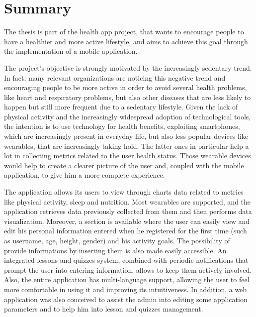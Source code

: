 \section{Summary}

The thesis is part of the health app project, that wants to encourage people to have a healthier and more active lifestyle, and aims to achieve this goal through the implementation of a mobile application.
\vspace{2ex}

\noindent The project's objective is strongly motivated by the increasingly sedentary trend. In fact, many relevant organizations are noticing this negative trend and encouraging people to be more active in order to avoid several health problems, like heart and respiratory problems, but also other diseases that are less likely to happen but still more frequent due to a sedentary lifestyle. Given the lack of physical activity and the increasingly widespread adoption of technological tools, the intention is to use technology for health benefits, exploiting smartphones, which are increasingly present in everyday life, but also less popular devices like wearables, that are increasingly taking hold. The latter ones in particular help a lot in collecting metrics related to the user health status. Those wearable devices would help to create a clearer picture of the user and, coupled with the mobile application, to give him a more complete experience. 
\vspace{2ex}

\noindent The application allows its users to view through charts data related to metrics like physical activity, sleep and nutrition. Most wearables are supported, and the application retrieves data previously collected from them and then performs data visualization. Moreover, a section is available where the user can easily view and edit his personal information entered when he registered for the first time (such as username, age, height, gender) and his activity goals. The possibility of provide informations by inserting them is also made easily accessible. An integrated lessons and quizzes system, combined with periodic notifications that prompt the user into entering information, allows to keep them actively involved. Also, the entire application has multi-language support, allowing the user to feel more comfortable in using it and improving its intuitiveness. In addition, a web application was also conceived to assist the admin into editing some application parameters and to help him into lesson and quizzes management. 
\newpage

